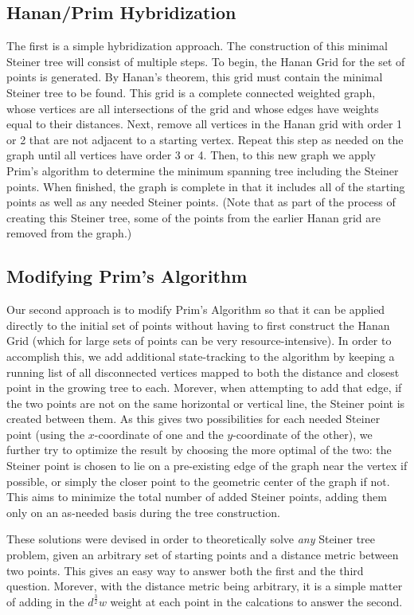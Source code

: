\documentclass[12pt,letterpaper]{article}
\theoremstyle{definition}\newtheorem{defn}[defncounter]{Definition}
\theoremstyle{remark}\newtheorem*{remark}{Remark}
\begin{document}
\subsection{Hanan/Prim Hybridization} 
The first is a simple hybridization approach.  The construction of this minimal Steiner tree 
will consist of multiple steps. To begin, the Hanan Grid for the set of points is generated. By Hanan's theorem, this grid must 
contain the minimal Steiner tree to be found. This grid is a complete connected weighted graph, whose vertices are all 
intersections of the grid and whose edges have weights equal to their distances. Next, remove all vertices in the Hanan grid with 
order 1 or 2 that are not adjacent to a starting vertex. Repeat this step as needed on the graph until all vertices have order 3 
or 4. Then, to this new graph we apply Prim's algorithm to determine the minimum spanning tree including the Steiner points. When 
finished, the graph is complete in that it includes all of the starting points as well as any needed Steiner points. (Note that as 
part of the process of creating this Steiner tree, some of the points from the earlier Hanan grid are removed from the graph.)

\subsection{Modifying Prim's Algorithm}
Our second approach is to modify Prim's Algorithm so that it can be applied directly to 
the initial set of points without having to first construct the Hanan Grid (which for large sets of points can be very 
resource-intensive). In order to accomplish this, we add additional state-tracking to the algorithm by keeping a running list of 
all disconnected vertices mapped to both the distance and closest point in the growing tree to each.  Morever, when attempting to 
add that edge, if the two points are not on the same horizontal or vertical line, the Steiner point is created between them. As 
this gives two possibilities for each needed Steiner point (using the \(x\)-coordinate of one and the \(y\)-coordinate of the 
other), we further try to optimize the result by choosing the more optimal of the two: the Steiner point is chosen to lie on a 
pre-existing edge of the graph near the vertex if possible, or simply the closer point to the geometric center of the graph if 
not. This aims to minimize the total number of added Steiner points, adding them only on an as-needed basis during the tree 
construction.

These solutions were devised in order to theoretically solve \emph{any} Steiner tree problem, given an arbitrary set of starting 
points and a distance metric between two points. This gives an easy way to answer both the first and the third question. Morever, 
with the distance metric being arbitrary, it is a simple matter of adding in the \(d^\frac{3}{2}w\) weight at each point in the 
calcations to answer the second. 
\end{document}
